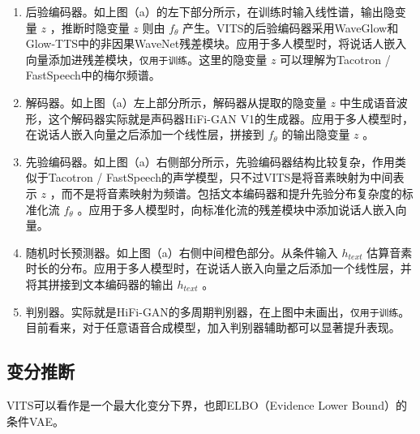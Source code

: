 \documentclass[cn,10pt,math=newtx,citestyle=gb7714-2015,bibstyle=gb7714-2015]{elegantbook}
\begin{document}
\begin{enumerate}
  \item 后验编码器。如上图（a）的左下部分所示，在训练时输入线性谱，输出隐变量 $z$ ，推断时隐变量 $z$ 则由 $f_\theta$ 产生。VITS的后验编码器采用WaveGlow和Glow-TTS中的非因果WaveNet残差模块。应用于多人模型时，将说话人嵌入向量添加进残差模块，\lstinline{仅用于训练}。这里的隐变量 $z$ 可以理解为Tacotron / FastSpeech中的梅尔频谱。
  \item 解码器。如上图（a）左上部分所示，解码器从提取的隐变量 $z$ 中生成语音波形，这个解码器实际就是声码器HiFi-GAN V1的生成器。应用于多人模型时，在说话人嵌入向量之后添加一个线性层，拼接到 $f_\theta$ 的输出隐变量 $z$ 。
  \item 先验编码器。如上图（a）右侧部分所示，先验编码器结构比较复杂，作用类似于Tacotron / FastSpeech的声学模型，只不过VITS是将音素映射为中间表示 $z$ ，而不是将音素映射为频谱。包括文本编码器和提升先验分布复杂度的标准化流 $f_\theta$ 。应用于多人模型时，向标准化流的残差模块中添加说话人嵌入向量。
  \item 随机时长预测器。如上图（a）右侧中间橙色部分。从条件输入 $h_{text}$ 估算音素时长的分布。应用于多人模型时，在说话人嵌入向量之后添加一个线性层，并将其拼接到文本编码器的输出 $h_{text}$ 。
  \item 判别器。实际就是HiFi-GAN的多周期判别器，在上图中未画出，\lstinline{仅用于训练}。目前看来，对于任意语音合成模型，加入判别器辅助都可以显著提升表现。
\end{enumerate}

\subsection{变分推断}

VITS可以看作是一个最大化变分下界，也即ELBO（Evidence Lower Bound）的条件VAE。
\end{document}
